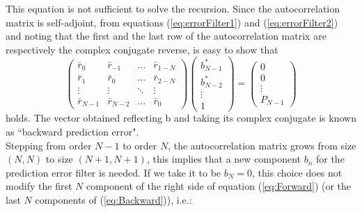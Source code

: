 \documentclass[twocolumn,showpacs,preprintnumbers,nofootinbib,prd,
superscriptaddress,10pt]{revtex4-1}
\begin{document}
This equation is not sufficient to solve the recursion. Since the autocorrelation matrix is self-adjoint, from equations (\ref{eq:errorFilter1}) and (\ref{eq:errorFilter2}) and noting that the first and the last row of the autocorrelation matrix are respectively the complex conjugate reverse, is easy to show that
\begin{equation}\label{eq:Backward}
     \begin{pmatrix}
    \bar r_0 & \bar r_{-1} & \dots &\bar r_{1 - N}\\
    \bar r_{1} & \bar r_0 & \dots & \bar r_{2 - N} \\ 
    \vdots & \vdots & \ddots & \vdots \\ 
    \bar r_{N - 1} & \bar r_{N -2} & \dots & \bar r_0
    \end{pmatrix} 
    \begin{pmatrix}
    b^*_{N-1} \\ b^*_{N- 2} \\\vdots \\ 1
    \end{pmatrix} 
    = 
    \begin{pmatrix}
    0 \\ 0 \\ \vdots \\ P_{N-1}
    \end{pmatrix} 
\end{equation}
holds. The vector obtained reflecting b and taking its complex conjugate is known as ``backward prediction error". \\ 
Stepping from order $N - 1$ to order $N$, the autocorrelation matrix grows from size $(N,N)$ to size $(N + 1, N + 1)$, this implies that a new component $b_n$ for the prediction error filter is needed. If we take it to be $b_N = 0$, this choice does not modify the first $N$ component of the right side of equation (\ref{eq:Forward}) (or the last $N$ components of (\ref{eq:Backward})), i.e.:
\end{document}
